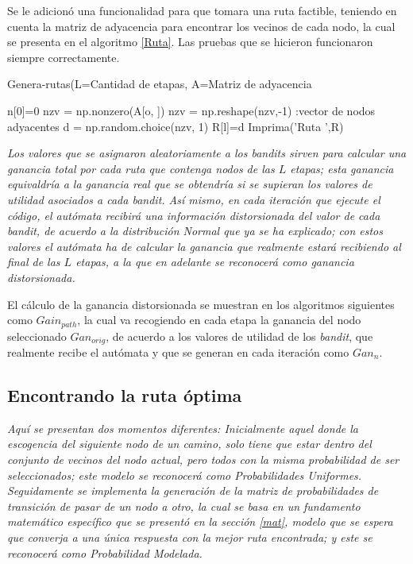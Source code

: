 Se le adicionó una funcionalidad para que tomara una ruta factible, teniendo en cuenta la matriz de adyacencia para encontrar los vecinos de cada nodo, la cual se presenta en el algoritmo \ref{Ruta}. Las pruebas que se hicieron funcionaron siempre correctamente.

\begin{algorithm} [h]
\caption{Genera-rutas(L=Cantidad de etapas, A=Matriz de adyacencia} 
\label{Ruta}
\begin{algorithmic}[1]
\STATE n[0]=0
    \STATE nzv = np.nonzero(A[o, ])
    \STATE nzv = np.reshape(nzv,-1) :vector de nodos adyacentes
        \STATE d = np.random.choice(nzv, 1)
        \STATE R[l]=d
    \ENDFOR   
\ENDFOR
\STATE Imprima('Ruta ',R)
\end{algorithmic}
\end{algorithm}

\textit{Los valores que se asignaron aleatoriamente a los \textit{bandits} sirven para calcular una ganancia total por cada ruta que contenga nodos de las $L$ etapas; esta ganancia equivaldría a la \textit{ganancia real} que se obtendría si se supieran los valores de utilidad asociados a cada \textit{bandit}. Así mismo, en cada iteración que ejecute el código, el autómata recibirá una información distorsionada del valor de cada \textit{bandit}, de acuerdo a la distribución Normal que ya se ha explicado; con estos valores el autómata ha de calcular la ganancia que realmente estará recibiendo al final de las $L$ etapas, a la que en adelante se reconocerá como \textit{ganancia distorsionada}. }

El cálculo de la ganancia distorsionada se muestran en los algoritmos siguientes como $Gain_{path}$, la cual va recogiendo en cada etapa la ganancia del nodo seleccionado $Gan_{orig}$, de acuerdo a los valores de utilidad de los \textit{bandit}, que realmente recibe el autómata y que se generan en cada iteración como $Gan_{n}$.

\subsection{Encontrando la ruta óptima}

\textit{Aquí se presentan dos momentos diferentes: Inicialmente aquel donde la escogencia del siguiente nodo de un camino, solo tiene que estar dentro del conjunto de vecinos del nodo actual, pero todos con la misma probabilidad de ser seleccionados; este modelo se reconocerá como Probabilidades Uniformes. Seguidamente se implementa la generación de la matriz de probabilidades de transición de pasar de un nodo a otro, la cual se basa en un fundamento matemático específico que se presentó en la sección \ref{mat}, modelo que se espera que converja a una única respuesta con la mejor ruta encontrada; y este se reconocerá como Probabilidad Modelada.}

